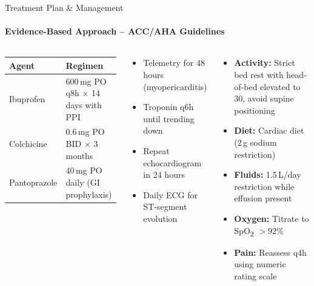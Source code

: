 \documentclass[10pt,aspectratio=169]{beamer}
\begin{document}
\begin{frame}{Treatment Plan \& Management}
  \framesubtitle{Evidence-Based Approach -- ACC/AHA Guidelines}

  \begin{columns}[T]
    \begin{tcolorbox}[infobox,title={\faPrescriptionBottle\hspace{4pt}Pharmacologic Therapy}]
      \small
      \renewcommand{\arraystretch}{1.3}
      \begin{tabular}{@{}p{}p{}@{}}
        \toprule
        \textbf{Agent} & \textbf{Regimen} \\
        \midrule
        Ibuprofen & 600\,mg PO q8h $\times$ 14 days with PPI \\
        Colchicine & 0.6\,mg PO BID $\times$ 3 months \\
        Pantoprazole & 40\,mg PO daily (GI prophylaxis) \\
        \bottomrule
      \end{tabular}
    \end{tcolorbox}

    \vspace{0.2cm}

    \begin{tcolorbox}[highlightbox,title={\faCalendarCheck\hspace{4pt}Monitoring Protocol}]
      \small
      \begin{itemize}
        \item Telemetry for 48 hours (myopericarditis)
        \item Troponin q6h until trending down
        \item Repeat echocardiogram in 24 hours
        \item Daily ECG for ST-segment evolution
      \end{itemize}
    \end{tcolorbox}

    \begin{tcolorbox}[infobox,title={\faUserMd\hspace{4pt}Non-Pharmacologic}]
      \small
      \begin{itemize}
        \item \textbf{Activity:} Strict bed rest with head-of-bed elevated to 30\textdegree, avoid supine positioning
        \item \textbf{Diet:} Cardiac diet (2\,g sodium restriction)
        \item \textbf{Fluids:} 1.5\,L/day restriction while effusion present
        \item \textbf{Oxygen:} Titrate to SpO\textsubscript{2} $>92$\% 
        \item \textbf{Pain:} Reassess q4h using numeric rating scale
      \end{itemize}
    \end{tcolorbox}


\end{columns}
\end{frame}
\end{document}
